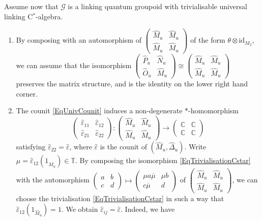 \documentclass[reqno]{amsart}
\numberwithin{equation}{section}
\newcommand{\C}{\mathbb{C}}
\newcommand{\id}{\mathrm{id}}
\newcommand{\msG}{\mathscr{G}}
\newcommand{\ov}{\overline}
\newcommand{\eps}{\varepsilon}
\begin{document}
Assume now that $\msG$ is a linking quantum groupoid with trivialisable universal linking C$^*$-algebra.
\begin{enumerate}
\item 
By composing with an automorphism of $\begin{pmatrix} \hat{M}_u& \hat{M}_u\\ \hat{M}_u&\hat{M}_u\end{pmatrix}$ of the form $\theta\otimes \id_{M_2}$, we can assume that the isomorphism $\begin{pmatrix} \hat{P}_u& \hat{N}_u\\ \hat{O}_u&\hat{M}_u\end{pmatrix}\cong \begin{pmatrix} \hat{M}_u& \hat{M}_u\\ \hat{M}_u&\hat{M}_u\end{pmatrix}$ preserves the matrix structure, and is the identity on the lower right hand corner.
\item The counit \eqref{EqUnivCounit} induces a non-degenerate $*$-homomorphism
\[
\begin{pmatrix} \hat{\varepsilon}_{11} & \hat{\varepsilon}_{12} \\ \hat{\varepsilon}_{21} & \hat{\varepsilon}_{22}\end{pmatrix}\colon \begin{pmatrix}\hat{M}_u & \hat{M}_u \\ \hat{M}_u & \hat{M}_u \end{pmatrix} \rightarrow \begin{pmatrix} \C&\C\\ \C & \C\end{pmatrix} 
\]
satisfying $\hat{\varepsilon}_{22} = \hat{\eps}$, where $\hat{\varepsilon}$ is the counit of $(\hat{M}_u,\hat{\Delta}_u)$. Write $\mu=\hat{\varepsilon}_{12}(1_{\hat{M}_u})\in \mathbb{T}$. By composing the isomorphism \eqref{EqTrivialisationCstar} with the automorphism $\begin{pmatrix}
a & b \\ c & d 
\end{pmatrix}\mapsto \begin{pmatrix}
\mu a \ov{\mu} & \mu b \\  c\ov{\mu} & d
\end{pmatrix}$ of $\begin{pmatrix} \hat{M}_u& \hat{M}_u\\ \hat{M}_u&\hat{M}_u\end{pmatrix}$, we can choose the trivialisation \eqref{EqTrivialisationCstar} in such a way that $\hat{\varepsilon}_{12}(1_{\hat{M}_u}) = 1$. We obtain $\hat{\varepsilon}_{ij} = \hat{\varepsilon}$. Indeed, we have

\end{enumerate}
\end{document}
